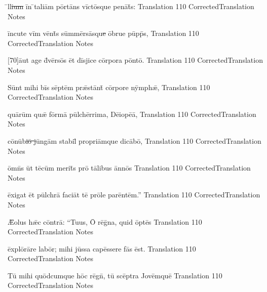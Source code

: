 \documentclass[]{book}
\begin{document}
\newpage

\latline
  {\={\macron {\i}}ll\sout{ium }\=in \={}t\-al\-i\=am p\=ort\={\macron a}ns v\=ict\={\macron o}squ\-e p\-en\={\macron a}t\={\macron {\i}}s:
}
  { Translation }
  {110}
  { CorrectedTranslation }
  { Notes }


\latline
  {\=inc\-ut\-e v\=im v\=ent\={\macron {\i}}s s\=umm\=ers\={\macron a}squ\sout{e }\=obrue p\=upp\={\macron {\i}}s,
}
  { Translation }
  {110}
  { CorrectedTranslation }
  { Notes }


\latline
  {[70]\={au}t \-ag\-e d\={\macron {\i}}v\=ers\={\macron o}s \=et d\=isj\-ic\-e c\=orp\-or\-a p\=ont\={\macron o}.
}
  { Translation }
  {110}
  { CorrectedTranslation }
  { Notes }

\newpage

\latline
  {S\=unt m\-ih\-i b\=is s\=ept\=em pr\={\ae}st\=ant\={\macron {\i}} c\=orp\-or\-e n\=ymph\={\ae},
}
  { Translation }
  {110}
  { CorrectedTranslation }
  { Notes }


\latline
  {qu\={\macron a}r\=um qu\={\ae} f\=orm\={\macron a} p\=ulch\=err\-im\-a, D\={\macron e}\-i\-op\={\macron e}\=a,
}
  { Translation }
  {110}
  { CorrectedTranslation }
  { Notes }


\latline
  {c\={\macron o}n\={\macron u}b\sout{i\={\macron o} j}\=ung\=am st\-ab\-il\={\macron {\i}} pr\-opr\-i\=amqu\-e d\-ic\={\macron a}b\=o,
}
  { Translation }
  {110}
  { CorrectedTranslation }
  { Notes }

\newpage
\latline
  {\=omn\={\macron {\i}}s \=ut t\={\macron e}c\=um m\-er\-it\={\macron {\i}}s pr\={\macron o} t\={\macron a}l\-ib\-us \=ann\={\macron o}s
}
  { Translation }
  {110}
  { CorrectedTranslation }
  { Notes }


\latline
  {\=ex\-ig\-at \=et p\=ulchr\={\macron a} f\-ac\-i\=at t\={\macron e} pr\={\macron o}l\-e p\-ar\=ent\=em.''
}
  { Translation }
  {110}
  { CorrectedTranslation }
  { Notes }


\latline
  {\={\AE}\-ol\-us h\={\ae}c c\=ontr\={\macron a}:  ``T\-u\-us, \={\macron O} r\={\macron e}g\={\macron {\i}}n\-a, qu\-id \=opt\={\macron e}s}
  { Translation }
  {110}
  { CorrectedTranslation }
  { Notes }
\newpage

\latline
  {\=expl\={\macron o}r\={\macron a}r\-e l\-ab\=or; m\-ih\-i j\=uss\-a c\-ap\=ess\-er\-e f\={\macron a}s \=est.
}
  { Translation }
  {110}
  { CorrectedTranslation }
  { Notes }


\latline
  {T\={\macron u} m\-ih\-i qu\=odc\-umqu\-e h\=oc r\={\macron e}gn\={\macron {\i}}, t\={\macron u} sc\={\macron e}ptr\-a J\-ov\=emqu\=e
}
  { Translation }
  {110}
  { CorrectedTranslation }
  { Notes }
\end{document}
